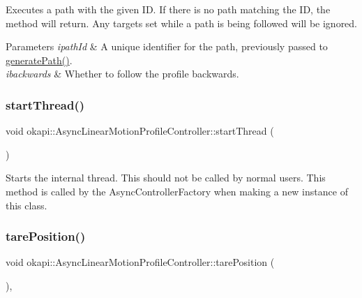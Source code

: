 Executes a path with the given ID. If there is no path matching the ID, the method will return. Any targets set while a path is being followed will be ignored.


\begin{DoxyParams}{Parameters}
{\em ipath\+Id} & A unique identifier for the path, previously passed to \mbox{\hyperlink{classokapi_1_1AsyncLinearMotionProfileController_aef2acba51417d929695ca38e309b0f6c}{generate\+Path()}}. \\
\hline
{\em ibackwards} & Whether to follow the profile backwards. \\
\hline
\end{DoxyParams}
\mbox{\label{classokapi_1_1AsyncLinearMotionProfileController_a6b9c0bc4fc13623225f0c02b992b3ed6}} 
\subsubsection{\texorpdfstring{startThread()}{startThread()}}
{\footnotesize\ttfamily void okapi\+::\+Async\+Linear\+Motion\+Profile\+Controller\+::start\+Thread (\begin{DoxyParamCaption}{ }\end{DoxyParamCaption})}

Starts the internal thread. This should not be called by normal users. This method is called by the Async\+Controller\+Factory when making a new instance of this class. \mbox{\label{classokapi_1_1AsyncLinearMotionProfileController_a6cfe67f9e4db556fbed1f2c4c4252b0a}} 
\subsubsection{\texorpdfstring{tarePosition()}{tarePosition()}}
{\footnotesize\ttfamily void okapi\+::\+Async\+Linear\+Motion\+Profile\+Controller\+::tare\+Position (\begin{DoxyParamCaption}{ }\end{DoxyParamCaption})\hspace{0.3cm}{\ttfamily [override]}, {\ttfamily [virtual]}}

